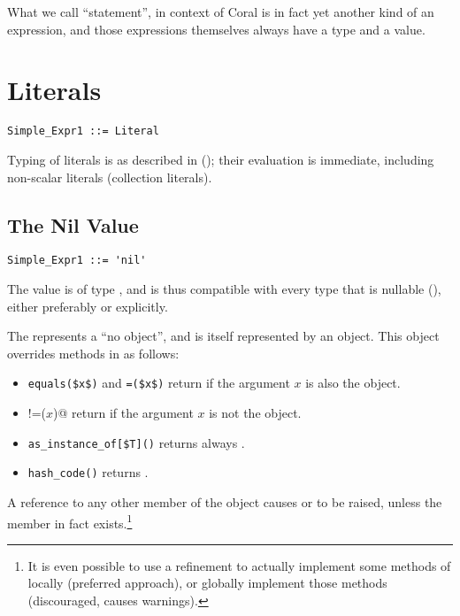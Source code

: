 What we call ``statement'', in context of Coral is in fact yet another kind of an expression, and those expressions themselves always have a type and a value. 





\section{Literals}

\syntax\begin{lstlisting}
Simple_Expr1 ::= Literal
\end{lstlisting}

Typing of literals is as described in (); their evaluation is immediate, including non-scalar literals (collection literals). 






\subsection{The Nil Value}

\syntax\begin{lstlisting}
Simple_Expr1 ::= 'nil'
\end{lstlisting}

The  value is of type , and is thus compatible with every type that is nullable (), either preferably or explicitly.

The  represents a ``no object'', and is itself represented by an object. This object overrides methods in  as follows: 
\begin{itemize}
\item 
\lstinline!equals($x$)! and \lstinline!=($x$)! return  if the argument $x$ is also the  object. 

\item 
\lstinline@!=($x$)@ return  if the argument $x$ is not the  object.

\item
\lstinline[mathescape=false]!as_instance_of[$T]()! returns always . 

\item
\lstinline!hash_code()! returns . 
\end{itemize}

A reference to any other member of the  object causes  or  to be raised, unless the member in fact exists.\footnote{It is even possible to use a refinement to actually implement some methods of  locally (preferred approach), or globally implement those methods (discouraged, causes warnings).} 






